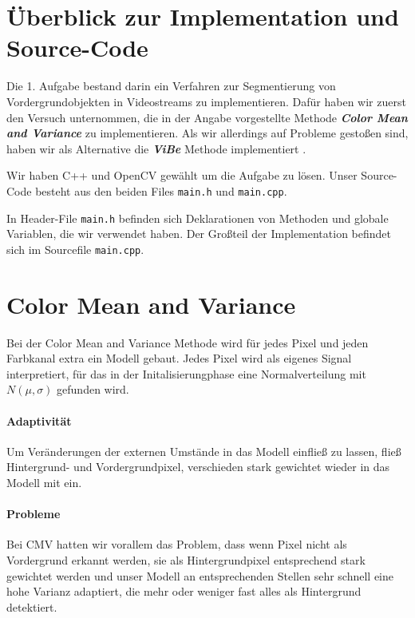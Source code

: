 \documentclass[]{scrartcl}
\begin{document}
\maketitle

\section{\"Uberblick zur Implementation und Source-Code}
Die 1. Aufgabe bestand darin ein Verfahren zur Segmentierung von Vordergrundobjekten in Videostreams zu implementieren. Daf\"ur haben wir zuerst den Versuch unternommen, die in der Angabe vorgestellte Methode \textbf{\textit{Color Mean and Variance}} zu implementieren. Als wir allerdings auf Probleme gesto\ss{}en sind, haben wir als Alternative die \textbf{\textit{ViBe}} Methode implementiert \cite{barnich2011vibe}.

Wir haben C++ und OpenCV gew\"ahlt um die Aufgabe zu l\"osen. Unser Source-Code besteht aus den beiden Files \texttt{main.h} und \texttt{main.cpp}.

In Header-File \texttt{main.h} befinden sich Deklarationen von Methoden und globale Variablen, die wir verwendet haben. Der Gro\ss{}teil der Implementation befindet sich im Sourcefile \texttt{main.cpp}. 



\section{Color Mean and Variance}\label{sec:cmv}
Bei der Color Mean and Variance Methode wird für jedes Pixel und jeden Farbkanal extra ein Modell gebaut. Jedes Pixel wird als eigenes Signal interpretiert, für das in der Initalisierungphase eine Normalverteilung mit $N(\mu, \sigma)$ gefunden wird. 

\paragraph{Adaptivit\"at} 
Um Veränderungen der externen Umst\"ande in das Modell einflie\ss{} zu lassen, flie\ss{} Hintergrund- und Vordergrundpixel, verschieden stark gewichtet wieder in das Modell mit ein.
\paragraph{Probleme} 
Bei CMV hatten wir vorallem das Problem, dass wenn Pixel nicht als Vordergrund erkannt werden, sie als Hintergrundpixel entsprechend stark gewichtet werden und unser Modell an entsprechenden Stellen sehr schnell eine hohe Varianz adaptiert, die mehr oder weniger fast alles als Hintergrund detektiert.
\end{document}
